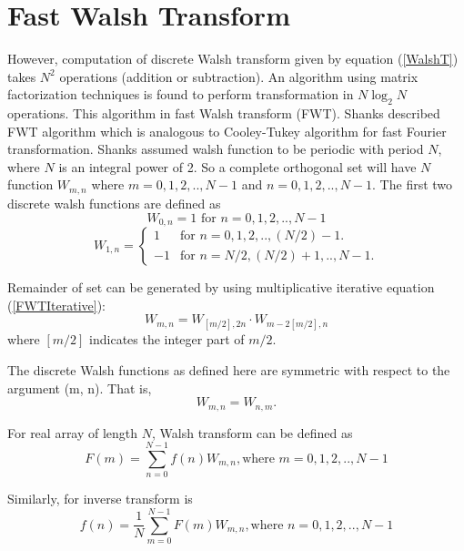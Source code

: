 \section{Fast Walsh Transform}
However, computation of discrete Walsh transform given by equation (\ref{WalshT}) takes $N^2$ operations (addition or subtraction).
An algorithm using matrix factorization techniques is found to perform transformation in $N \log_2 N$ operations.
This algorithm in fast Walsh transform (FWT). 
Shanks \cite{Shanks1969} described FWT algorithm which is analogous to Cooley-Tukey \cite{CooleyTukey1965} algorithm for fast Fourier transformation. Shanks assumed walsh function to be periodic with period $N$, where $N$ is an integral power of 2. So a complete orthogonal set will have $N$ function $W_{m,n}$ where $m = 0, 1, 2,.., N-1$ and $n = 0, 1, 2,.., N-1$. The first two discrete walsh functions are defined as 
\begin{equation}
\label{FWT1}
W_{0,n} = 1    \text{ for $n = 0, 1, 2,.., N-1$}
\end{equation}
\begin{equation}
\label{FWT2}
W_{1,n} = \begin{cases}
    1 & \text{for $n = 0, 1, 2,.., (N/2)-1$}.\\
    -1 & \text{for $n = N/2, (N/2)+1,.., N-1$}.
  \end{cases}
\end{equation}

Remainder of set can be generated by using multiplicative iterative equation (\ref{FWTIterative}): 
\begin{equation}
\label{FWT3}
W_{m,n} = W_{[m/2],2n}\cdot W_{m-2[m/2], n}
\end{equation}
where $[m/2]$ indicates the integer part of $m/2$.

The discrete Walsh functions as defined here are symmetric with respect to the argument (m, n). That is,
\[
W_{m, n} = W_{n,m}.
\]

For real array of length $N$, Walsh transform can be defined as 
\begin{equation}
\label{FWT4}
F(m) = \sum\limits_{n=0}^{N-1} f(n) W_{m,n}, \text{where $m = 0, 1, 2,.., N-1$}
\end{equation}

Similarly, for inverse transform is
\begin{equation}
\label{FWT5}
f(n) = \frac{1}{N}\sum\limits_{m=0}^{N-1} F(m) W_{m,n}, \text{where $n = 0, 1, 2,.., N-1$}
\end{equation}


